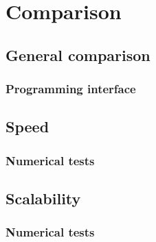 
\section{Comparison}\label{sec:numer}

\subsection{General comparison}

\begin{frame}
  \MyLogo
  \frametitle{Programming interface}  

\end{frame}

\subsection{Speed}

\begin{frame}
  \MyLogo
  \frametitle{Numerical tests}  

\end{frame}

\subsection{Scalability}

\begin{frame}
  \MyLogo
  \frametitle{Numerical tests}  

\end{frame}